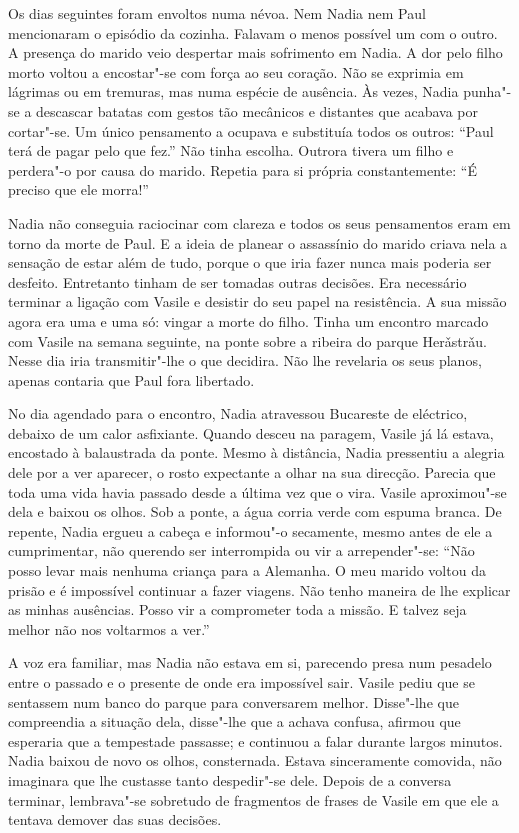Os dias seguintes foram envoltos numa névoa. Nem Nadia nem Paul
mencionaram o episódio da cozinha. Falavam o menos possível um com o
outro. A presença do marido veio despertar mais sofrimento em Nadia. A
dor pelo filho morto voltou a encostar"-se com força ao seu coração. Não
se exprimia em lágrimas ou em tremuras, mas numa espécie de ausência. Às
vezes, Nadia punha"-se a descascar batatas com gestos tão mecânicos e
distantes que acabava por cortar"-se. Um único pensamento a ocupava e
substituía todos os outros: ``Paul terá de pagar pelo que fez.'' Não tinha
escolha. Outrora tivera um filho e perdera"-o por causa do marido.
Repetia para si própria constantemente: ``É preciso que ele morra!''

Nadia não conseguia raciocinar com clareza e todos os seus pensamentos
eram em torno da morte de Paul. E a ideia de planear o assassínio do
marido criava nela a sensação de estar além de tudo, porque o que iria
fazer nunca mais poderia ser desfeito. Entretanto tinham de ser tomadas outras decisões. Era necessário terminar a ligação com Vasile e
desistir do seu papel na resistência. A sua missão agora era uma e uma
só: vingar a morte do filho. Tinha um encontro marcado com Vasile na
semana seguinte, na ponte sobre a ribeira do parque Herǎstrǎu. Nesse
dia iria transmitir"-lhe o que decidira. Não lhe revelaria os seus
planos, apenas contaria que Paul fora libertado.

\bigskip

No dia agendado para o encontro, Nadia atravessou Bucareste de
eléctrico, debaixo de um calor asfixiante. Quando desceu na paragem,
Vasile já lá estava, encostado à balaustrada da ponte. Mesmo à
distância, Nadia pressentiu a alegria dele por a ver aparecer, o rosto expectante a olhar na sua direcção. Parecia que toda uma vida havia passado desde a última vez
que o vira. Vasile aproximou"-se dela e baixou os olhos. Sob a ponte, a
água corria verde com espuma branca. De repente, Nadia ergueu a cabeça e
informou"-o secamente, mesmo antes de ele a cumprimentar, não querendo
ser interrompida ou vir a arrepender"-se:
``Não posso levar mais nenhuma criança para a Alemanha. O meu marido
voltou da prisão e é impossível continuar a fazer viagens. Não tenho
maneira de lhe explicar as minhas ausências. Posso vir a comprometer
toda a missão. E talvez seja melhor não nos voltarmos a ver.''

A voz era familiar, mas Nadia não estava em si, parecendo presa num
pesadelo entre o passado e o presente de onde era impossível sair.
Vasile pediu que se sentassem num banco do parque para conversarem
melhor. Disse"-lhe que compreendia a situação dela, disse"-lhe que a
achava confusa, afirmou que esperaria que a tempestade passasse; e
continuou a falar durante largos minutos. Nadia baixou de novo os olhos,
consternada. Estava sinceramente comovida, não imaginara que lhe
custasse tanto despedir"-se dele. Depois de a conversa terminar,
lembrava"-se sobretudo de fragmentos de frases de Vasile em que ele a
tentava demover das suas decisões.

